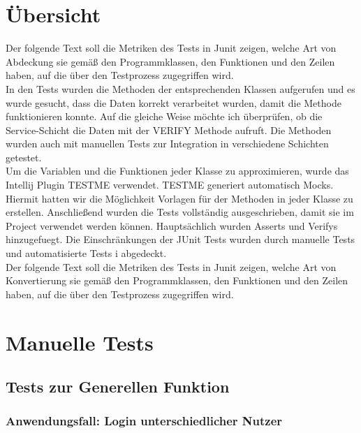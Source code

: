 \documentclass[enabledeprecatedfontcommands,fontsize=12pt,paper=a4,twoside]{scrartcl}
\begin{document}


\section{Übersicht}

Der folgende Text soll die Metriken des Tests in Junit zeigen, welche Art von Abdeckung sie gemäß den Programmklassen, den Funktionen und den Zeilen haben, auf die über den Testprozess zugegriffen wird.\\

In den Tests wurden die Methoden der entsprechenden Klassen aufgerufen und es wurde gesucht, dass die Daten korrekt verarbeitet wurden, damit die Methode funktionieren konnte. Auf die gleiche Weise möchte ich überprüfen, ob die Service-Schicht die Daten mit der VERIFY Methode aufruft. Die Methoden wurden auch mit manuellen Tests zur Integration in verschiedene Schichten getestet.\\

Um die Variablen und die Funktionen jeder Klasse zu approximieren, wurde das Intellij Plugin TESTME verwendet. TESTME generiert automatisch Mocks. Hiermit hatten wir die Möglichkeit  Vorlagen für der Methoden in jeder Klasse zu erstellen. Anschließend wurden die Tests vollständig ausgeschrieben, damit sie im Project verwendet werden können. Hauptsächlich wurden Asserts und Verifys hinzugefuegt. Die Einschränkungen der JUnit Tests wurden durch manuelle Tests und automatisierte Tests i abgedeckt.\\

Der folgende Text soll die Metriken des Tests in Junit zeigen, welche Art von Konvertierung sie gemäß den Programmklassen, den Funktionen und den Zeilen haben, auf die über den Testprozess zugegriffen wird.



\newpage
\section{Manuelle Tests}


\subsection{Tests zur Generellen Funktion}

\subsubsection{Anwendungsfall: Login unterschiedlicher Nutzer}
\end{document}
